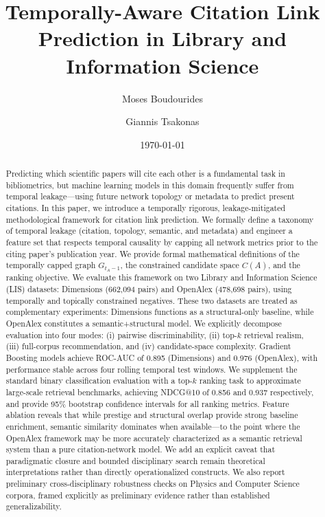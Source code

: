 \documentclass[11pt,a4paper]{article}
\title{Temporally-Aware Citation Link Prediction in Library and Information Science}
\author[1]{Moses Boudourides}
\author[2]{Giannis Tsakonas}
\affil[1]{Department of Mathematics, University of Patras, Greece}
\affil[2]{Library \& Information Center, University of Patras, Greece}
\date{\today}
\begin{document}
\maketitle

\begin{abstract}
Predicting which scientific papers will cite each other is a fundamental task in bibliometrics, but machine learning models in this domain frequently suffer from temporal leakage---using future network topology or metadata to predict present citations. In this paper, we introduce a temporally rigorous, leakage-mitigated methodological framework for citation link prediction. We formally define a taxonomy of temporal leakage (citation, topology, semantic, and metadata) and engineer a feature set that respects temporal causality by capping all network metrics prior to the citing paper's publication year. We provide formal mathematical definitions of the temporally capped graph $G_{t_A-1}$, the constrained candidate space $C(A)$, and the ranking objective. We evaluate this framework on two Library and Information Science (LIS) datasets: Dimensions (662,094 pairs) and OpenAlex (478,698 pairs), using temporally and topically constrained negatives. These two datasets are treated as complementary experiments: Dimensions functions as a structural-only baseline, while OpenAlex constitutes a semantic+structural model. We explicitly decompose evaluation into four modes: (i) pairwise discriminability, (ii) top-$k$ retrieval realism, (iii) full-corpus recommendation, and (iv) candidate-space complexity. Gradient Boosting models achieve ROC-AUC of 0.895 (Dimensions) and 0.976 (OpenAlex), with performance stable across four rolling temporal test windows. We supplement the standard binary classification evaluation with a top-$k$ ranking task to approximate large-scale retrieval benchmarks, achieving NDCG@10 of 0.856 and 0.937 respectively, and provide 95\% bootstrap confidence intervals for all ranking metrics. Feature ablation reveals that while prestige and structural overlap provide strong baseline enrichment, semantic similarity dominates when available---to the point where the OpenAlex framework may be more accurately characterized as a semantic retrieval system than a pure citation-network model. We add an explicit caveat that paradigmatic closure and bounded disciplinary search remain theoretical interpretations rather than directly operationalized constructs. We also report preliminary cross-disciplinary robustness checks on Physics and Computer Science corpora, framed explicitly as preliminary evidence rather than established generalizability.
\end{abstract}
\end{document}
